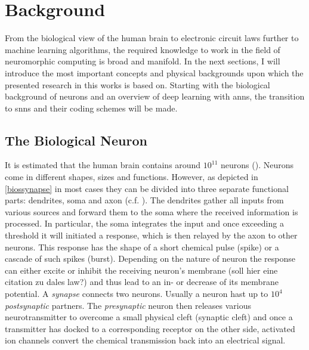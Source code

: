 \chapter{Background}
From the biological view of the human brain to electronic circuit laws further to machine learning algorithms, the required knowledge to work in the field of neuromorphic computing is broad and manifold. In the next sections, I will introduce the most important concepts and physical backgrounds upon which the presented research in this works is based on. Starting with the biological background of neurons and an overview of deep learning with \glspl{ann}, the transition to \glspl{snn} and their coding schemes will be made.

\section{The Biological Neuron}

It is estimated that the human brain contains around $10^{11}$ neurons (\cite{numberofneurons}). Neurons come in different shapes, sizes and functions. However, as depicted in \cref{biossynapse} in most cases they can be divided into three separate functional parts: dendrites, soma and axon (c.f. \cite{gerstner2014dynamics}). The dendrites gather all inputs from various sources and forward them to the soma where the received information is processed. In particular, the soma integrates the input and once exceeding a threshold it will initiated a response, which is then relayed by the axon to other neurons. This response has the shape of a short chemical pulse (spike) or a cascade of such spikes (burst). Depending on the nature of neuron the response can either excite or inhibit the receiving neuron's membrane (soll hier eine citation zu dales law?) and thus lead to an in- or decrease of its membrane potential. A \emph{synapse} connects two neurons. Usually a neuron hast up to $10^4$ \emph{postsynaptic} partners. The \emph{presynaptic} neuron then releases various neurotransmitter to overcome a small physical cleft (synaptic cleft) and once a transmitter has docked to a corresponding receptor on the other side, activated ion channels convert the chemical transmission back into an electrical signal.\\

